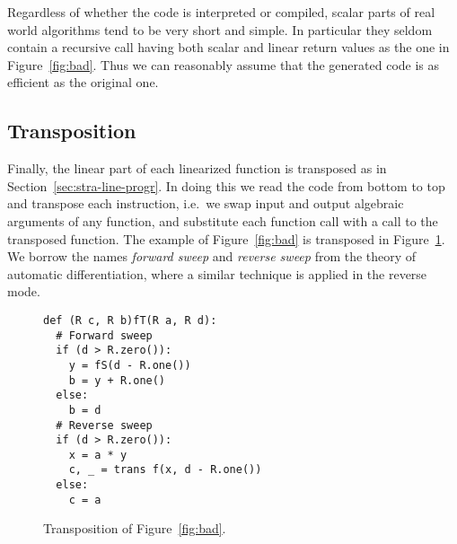\begin{remark}
  Regardless of whether the code is interpreted or compiled, scalar
  parts of real world algorithms tend to be very short and simple. In
  particular they seldom contain a recursive call having both scalar
  and linear return values as the one in Figure~\ref{fig:bad}. Thus we
  can reasonably assume that the generated code is as efficient as the
  original one.
\end{remark}


\subsection{Transposition}
\label{sec:transposition}
Finally, the linear part of each linearized function is transposed as
in Section~\ref{sec:stra-line-progr}. In doing this we read the code
from bottom to top and transpose each instruction, i.e.\ we swap input
and output algebraic arguments of any function, and substitute each
function call with a call to the transposed function. The example of
Figure~\ref{fig:bad} is transposed in Figure~\ref{fig:mechant}. We
borrow the names \emph{forward sweep} and
\emph{reverse sweep} from the theory of automatic
differentiation, where a similar technique is applied in the reverse
mode.

\begin{figure}[hb]
  \centering
\begin{lstlisting}
def (R c, R b)fT(R a, R d):
  # Forward sweep
  if (d > R.zero()):
    y = fS(d - R.one())
    b = y + R.one()
  else:
    b = d
  # Reverse sweep
  if (d > R.zero()):
    x = a * y
    c, _ = trans f(x, d - R.one())
  else:
    c = a
\end{lstlisting}
  \caption{Transposition of Figure~\ref{fig:bad}.}
  \label{fig:mechant}
\end{figure}




